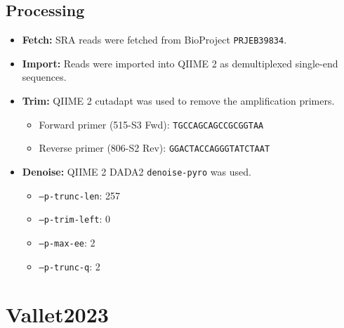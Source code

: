 \documentclass[11pt,a4paper]{article}
\begin{document}
\subsection{Processing}
\begin{itemize}

\item \textbf{Fetch:} SRA reads were fetched from BioProject \texttt{PRJEB39834}.
\item \textbf{Import:} Reads were imported into QIIME 2 as demultiplexed single-end sequences.
\item \textbf{Trim:} QIIME 2 cutadapt was used to remove the amplification primers.
  \begin{itemize}
  \item Forward primer (515-S3 Fwd): \texttt{TGCCAGCAGCCGCGGTAA}
  \item Reverse primer (806-S2 Rev): \texttt{GGACTACCAGGGTATCTAAT}
  \end{itemize}
\item \textbf{Denoise:} QIIME 2 DADA2 \texttt{denoise-pyro} was used.
  \begin{itemize}
  \item \texttt{--p-trunc-len}: 257
  \item \texttt{--p-trim-left}: 0
  \item \texttt{--p-max-ee}: 2
  \item \texttt{--p-trunc-q}: 2
  \end{itemize}
\end{itemize}

\section{Vallet2023}
\end{document}
